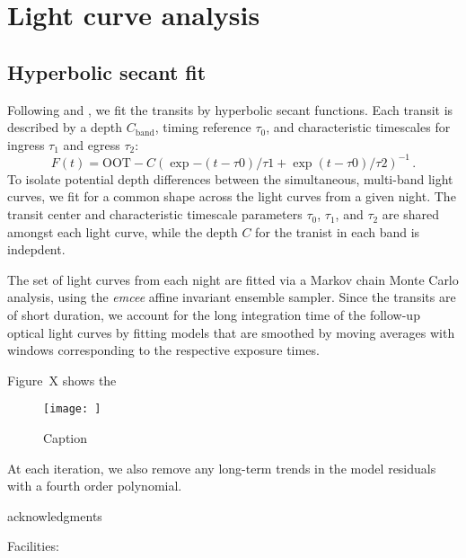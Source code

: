 \documentclass[iop]{emulateapj}
\begin{document}
\section{Light curve analysis}
\label{sec:lightcurve_model}

\subsection{Hyperbolic secant fit}
\label{sec:hyperbol}

Following \citet{2012ApJ...752....1R} and \citet{2015arXiv151006434C}, we fit the transits by hyperbolic secant functions. Each transit is described by a depth $C_\mathrm{band}$, timing reference $\tau_0$, and characteristic timescales for ingress $\tau_1$ and egress $\tau_2$:
\begin{equation}
  F(t) = \mathrm{OOT} - C \left( \exp{-(t-\tau0)/\tau1} + \exp{(t-\tau0)/\tau2} \right)^{-1}\,.
\end{equation}
To isolate potential depth differences between the simultaneous, multi-band light curves, we fit for a common shape across the light curves from a given night. The transit center and characteristic timescale parameters $\tau_0$, $\tau_1$, and $\tau_2$ are shared amongst each light curve, while the depth $C$ for the tranist in each band is indepdent.

The set of light curves from each night are fitted via a Markov chain Monte Carlo analysis, using the \emph{emcee} \citep{2013PASP..125..306F} affine invariant ensemble sampler. Since the transits are of short duration, we account for the long integration time of the follow-up optical light curves by fitting models that are smoothed by moving averages with windows corresponding to the respective exposure times.

Figure~X shows the 

\begin{figure*}
    \centering
    \texttt{[image: ]}
    \caption{Caption}
    \label{fig:my_label}
\end{figure*}





At each iteration, we also remove any long-term trends in the model residuals with a fourth order polynomial. 


\acknowledgments
acknowledgments

Facilities: 



\end{document}
